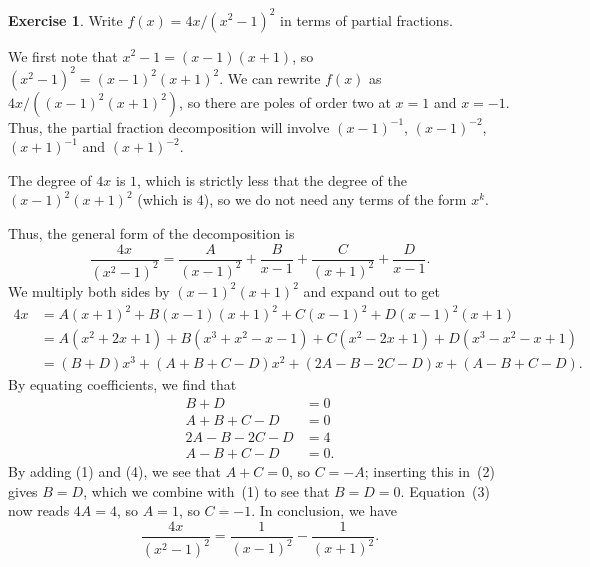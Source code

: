 \documentclass[a4paper]{book}
\renewcommand{\:}{\colon}
\theoremstyle{definition}
\newtheorem{exercise}[theorem]{Exercise}
\renewenvironment{solution}{\SolutionInline}{\endSolutionInline}
\begin{document}
\begin{exercise}
 Write $f(x)=4x/(x^2-1)^2$ in terms of partial fractions.
\end{exercise}
\begin{solution}
 We first note that $x^2-1=(x-1)(x+1)$, so $(x^2-1)^2=(x-1)^2(x+1)^2$.
 We can rewrite $f(x)$ as $4x/((x-1)^2(x+1)^2)$, so there are poles of
 order two at $x=1$ and $x=-1$.  Thus, the partial fraction
 decomposition will involve $(x-1)^{-1}$, $(x-1)^{-2}$, $(x+1)^{-1}$
 and $(x+1)^{-2}$.
 
 The degree of $4x$ is $1$, which is strictly less that the degree of
 the $(x-1)^2(x+1)^2$ (which is $4$), so we do not need any terms of
 the form $x^k$.

 Thus, the general form of the decomposition is
 \[ \frac{4x}{(x^2-1)^2} = \frac{A}{(x-1)^2} + \frac{B}{x-1} + 
                           \frac{C}{(x+1)^2} + \frac{D}{x-1}.
 \]
 We multiply both sides by $(x-1)^2(x+1)^2$ and expand out to get
 \begin{align*}
  4x &= A(x+1)^2 + B(x-1)(x+1)^2 + C(x-1)^2 + D(x-1)^2(x+1) \\
     &= A(x^2+2x+1) + B(x^3+x^2-x-1) + C(x^2-2x+1) + D(x^3-x^2-x+1) \\
     &= (B+D)x^3 + (A+B+C-D)x^2 + (2A-B-2C-D)x + (A-B+C-D).
 \end{align*}
 By equating coefficients, we find that
 \begin{align*}
  B+D &= 0       \tag{1}\\
  A+B+C-D &= 0   \tag{2}\\
  2A-B-2C-D &= 4 \tag{3}\\
  A-B+C-D &= 0.  \tag{4}
 \end{align*}
 By adding (1) and (4), we see that $A+C=0$, so $C=-A$; inserting this
 in~(2) gives $B=D$, which we combine with~(1) to see that $B=D=0$.
 Equation~(3) now reads $4A=4$, so $A=1$, so $C=-1$.  In conclusion,
 we have
 \[ \frac{4x}{(x^2-1)^2} = \frac{1}{(x-1)^2} -
                           \frac{1}{(x+1)^2}. 
 \]
\end{solution}
\end{document}

